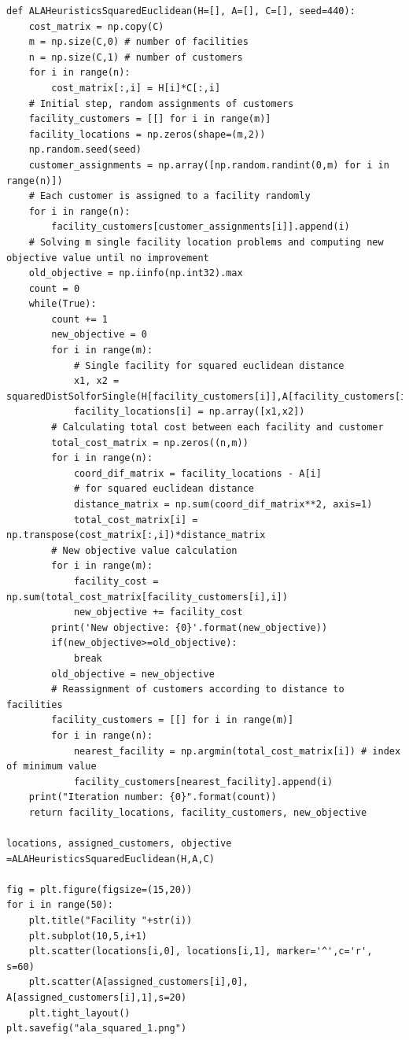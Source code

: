 \documentclass[12pt]{article}
\begin{document}
\begin{lstlisting}[style=pythonstyle,numbers=none]
def ALAHeuristicsSquaredEuclidean(H=[], A=[], C=[], seed=440): 
    cost_matrix = np.copy(C)
    m = np.size(C,0) # number of facilities
    n = np.size(C,1) # number of customers
    for i in range(n):
        cost_matrix[:,i] = H[i]*C[:,i]
    # Initial step, random assignments of customers
    facility_customers = [[] for i in range(m)]
    facility_locations = np.zeros(shape=(m,2))
    np.random.seed(seed)
    customer_assignments = np.array([np.random.randint(0,m) for i in range(n)])
    # Each customer is assigned to a facility randomly
    for i in range(n):
        facility_customers[customer_assignments[i]].append(i)
    # Solving m single facility location problems and computing new objective value until no improvement
    old_objective = np.iinfo(np.int32).max
    count = 0
    while(True):
        count += 1
        new_objective = 0
        for i in range(m):
            # Single facility for squared euclidean distance
            x1, x2 = squaredDistSolforSingle(H[facility_customers[i]],A[facility_customers[i]],C[:,facility_customers[i]],i)
            facility_locations[i] = np.array([x1,x2])
        # Calculating total cost between each facility and customer
        total_cost_matrix = np.zeros((n,m))
        for i in range(n):
            coord_dif_matrix = facility_locations - A[i]
            # for squared euclidean distance
            distance_matrix = np.sum(coord_dif_matrix**2, axis=1)
            total_cost_matrix[i] = np.transpose(cost_matrix[:,i])*distance_matrix
        # New objective value calculation
        for i in range(m):
            facility_cost = np.sum(total_cost_matrix[facility_customers[i],i])
            new_objective += facility_cost
        print('New objective: {0}'.format(new_objective))    
        if(new_objective>=old_objective):
            break
        old_objective = new_objective
        # Reassignment of customers according to distance to facilities
        facility_customers = [[] for i in range(m)]
        for i in range(n):
            nearest_facility = np.argmin(total_cost_matrix[i]) # index of minimum value
            facility_customers[nearest_facility].append(i)   
    print("Iteration number: {0}".format(count))    
    return facility_locations, facility_customers, new_objective

locations, assigned_customers, objective =ALAHeuristicsSquaredEuclidean(H,A,C)

fig = plt.figure(figsize=(15,20))
for i in range(50):
    plt.title("Facility "+str(i))
    plt.subplot(10,5,i+1)
    plt.scatter(locations[i,0], locations[i,1], marker='^',c='r', s=60)
    plt.scatter(A[assigned_customers[i],0], A[assigned_customers[i],1],s=20)
    plt.tight_layout()
plt.savefig("ala_squared_1.png")



\end{lstlisting}
\end{document}
